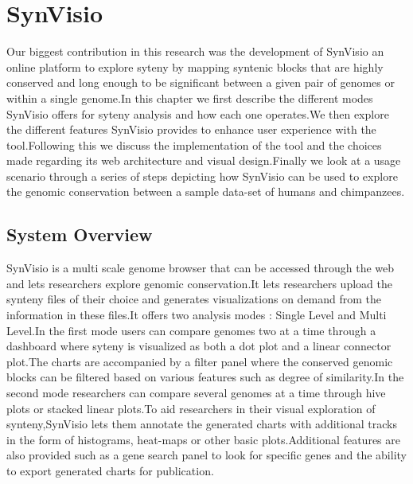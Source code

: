 \chapter{SynVisio}

Our biggest contribution in this research was the development of SynVisio an online platform to explore syteny by mapping syntenic blocks that are highly conserved and long enough to be significant between a given pair of genomes or within a single genome.In this chapter we first describe the different modes SynVisio offers for syteny analysis and how each one operates.We then explore the different features SynVisio provides to enhance user experience with the tool.Following this we discuss the implementation of the tool and the choices made regarding its web architecture and visual design.Finally we look at a  usage scenario through a series of steps depicting how SynVisio can be used to explore the genomic conservation between a sample data-set of humans and chimpanzees.

\section{System Overview}
SynVisio is a multi scale genome browser that can be accessed through the web and lets researchers explore genomic conservation.It lets researchers upload the synteny files of their choice and generates visualizations on demand from the information in these files.It offers two analysis modes : Single Level and Multi Level.In the first mode users can compare genomes two at a time through a dashboard where syteny is visualized as both a dot plot and a linear connector plot.The charts are accompanied by a filter panel where the conserved genomic blocks can be filtered based on various features such as degree of similarity.In the second mode researchers can compare several genomes at a time through hive plots or stacked linear plots.To aid researchers in their visual exploration of synteny,SynVisio lets them annotate the generated charts with additional tracks in the form of histograms, heat-maps or other basic plots.Additional features are also provided such as a gene search panel to look for specific genes and the ability to export generated charts for publication.

